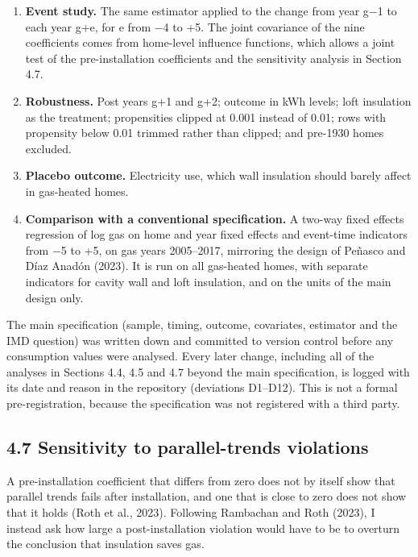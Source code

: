 \documentclass[11pt,a4paper]{article}
\providecommand{\tightlist}{\setlength{\itemsep}{0pt}\setlength{\parskip}{0pt}}
\begin{document}
\begin{enumerate}
\def\labelenumi{\arabic{enumi}.}
\tightlist
\item
  \textbf{Event study.} The same estimator applied to the change from year g−1 to each year g+e, for e from −4 to +5. The joint covariance of the nine coefficients comes from home-level influence functions, which allows a joint test of the pre-installation coefficients and the sensitivity analysis in Section 4.7.
\item
  \textbf{Robustness.} Post years g+1 and g+2; outcome in kWh levels; loft insulation as the treatment; propensities clipped at 0.001 instead of 0.01; rows with propensity below 0.01 trimmed rather than clipped; and pre-1930 homes excluded.
\item
  \textbf{Placebo outcome.} Electricity use, which wall insulation should barely affect in gas-heated homes.
\item
  \textbf{Comparison with a conventional specification.} A two-way fixed effects regression of log gas on home and year fixed effects and event-time indicators from −5 to +5, on gas years 2005--2017, mirroring the design of Peñasco and Díaz Anadón (2023). It is run on all gas-heated homes, with separate indicators for cavity wall and loft insulation, and on the units of the main design only.
\end{enumerate}

The main specification (sample, timing, outcome, covariates, estimator and the IMD question) was written down and committed to version control before any consumption values were analysed. Every later change, including all of the analyses in Sections 4.4, 4.5 and 4.7 beyond the main specification, is logged with its date and reason in the repository (deviations D1--D12). This is not a formal pre-registration, because the specification was not registered with a third party.

\subsection*{4.7 Sensitivity to parallel-trends violations}

A pre-installation coefficient that differs from zero does not by itself show that parallel trends fails after installation, and one that is close to zero does not show that it holds (Roth et al., 2023). Following Rambachan and Roth (2023), I instead ask how large a post-installation violation would have to be to overturn the conclusion that insulation saves gas.
\end{document}
